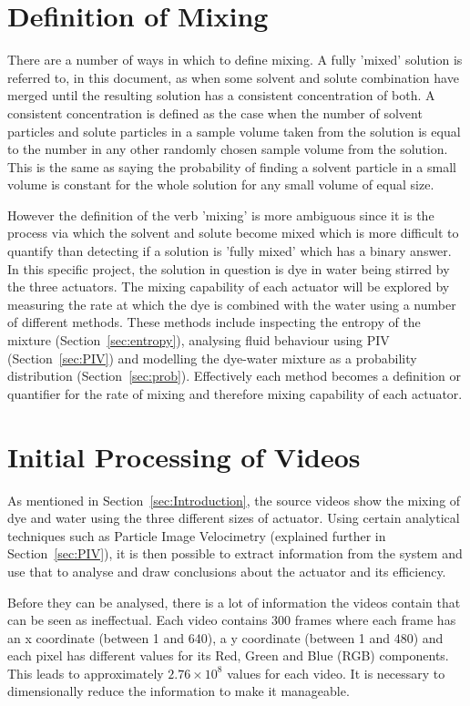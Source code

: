 \section{Definition of Mixing}


There are a number of ways in which to define mixing. A fully 'mixed' solution is referred to, in this document, as when some solvent and solute combination have merged until the resulting solution has a consistent concentration of both. A consistent concentration is defined as the case when the number of solvent particles and solute particles in a sample volume taken from the solution is equal to the number in any other randomly chosen sample volume from the solution. This is the same as saying the probability of finding a solvent particle in a small volume is constant for the whole solution for any small volume of equal size.

However the definition of the verb 'mixing' is more ambiguous since it is the process via which the solvent and solute become mixed which is more difficult to quantify than detecting if a solution is 'fully mixed' which has a binary answer. In this specific project, the solution in question is dye in water being stirred by the three actuators. The mixing capability of each actuator will be explored by measuring the rate at which the dye is combined with the water using a number of different methods. These methods include inspecting the entropy of the mixture (Section~\ref{sec:entropy}), analysing fluid behaviour using PIV (Section~\ref{sec:PIV}) and modelling the dye-water mixture as a probability distribution (Section~\ref{sec:prob}). Effectively each method becomes a definition or quantifier for the rate of mixing and therefore mixing capability of each actuator.




\section{Initial Processing of Videos}
\label{sec:process}

As mentioned in Section~\ref{sec:Introduction}, the source videos show the mixing of dye and water using the three different sizes of actuator. Using certain analytical techniques such as Particle Image Velocimetry (explained further in Section~\ref{sec:PIV}), it is then possible to extract information from the system and use that to analyse and draw conclusions about the actuator and its efficiency.

Before they can be analysed, there is a lot of information the videos contain that can be seen as ineffectual. Each video contains 300 frames where each frame has an x coordinate (between 1 and 640), a y coordinate (between 1 and 480) and each pixel has different values for its Red, Green and Blue (RGB) components. This leads to approximately $2.76\times10^{8}$ values for each video. It is necessary to dimensionally reduce the information to make it manageable.


